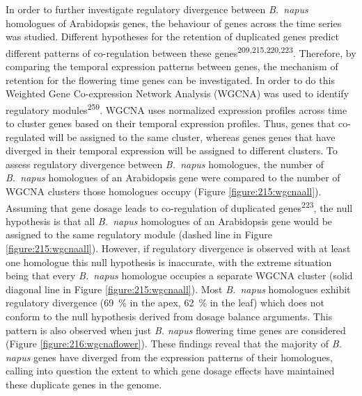 \documentclass[12pt,]{book}
\begin{document}
In order to further investigate regulatory divergence between
\emph{B.~napus} homologues of Arabidopsis genes, the behaviour of genes
across the time series was studied. Different hypotheses for the
retention of duplicated genes predict different patterns of
co-regulation between these genes\textsuperscript{209,215,220,223}.
Therefore, by comparing the temporal expression patterns between genes,
the mechanism of retention for the flowering time genes can be
investigated. In order to do this Weighted Gene Co-expression Network
Analysis (WGCNA) was used to identify regulatory
modules\textsuperscript{259}. WGCNA uses normalized expression profiles
across time to cluster genes based on their temporal expression
profiles. Thus, genes that co-regulated will be assigned to the same
cluster, whereas genes genes that have diverged in their temporal
expression will be assigned to different clusters. To assess regulatory
divergence between \emph{B.~napus} homologues, the number of
\emph{B.~napus} homologues of an Arabidopsis gene were compared to the
number of WGCNA clusters those homologues occupy (Figure
\ref{figure:215:wgcnaall}). Assuming that gene dosage leads to
co-regulation of duplicated genes\textsuperscript{223}, the null
hypothesis is that all \emph{B.~napus} homologues of an Arabidopsis gene
would be assigned to the same regulatory module (dashed line in Figure
\ref{figure:215:wgcnaall}). However, if regulatory divergence is
observed with at least one homologue this null hypothesis is inaccurate,
with the extreme situation being that every \emph{B.~napus} homologue
occupies a separate WGCNA cluster (solid diagonal line in Figure
\ref{figure:215:wgcnaall}). Most \emph{B.~napus} homologues exhibit
regulatory divergence (69~\% in the apex, 62~\% in the leaf) which does
not conform to the null hypothesis derived from dosage balance
arguments. This pattern is also observed when just \emph{B. napus}
flowering time genes are considered (Figure
\ref{figure:216:wgcnaflower}). These findings reveal that the majority
of \emph{B. napus} genes have diverged from the expression patterns of
their homologues, calling into question the extent to which gene dosage
effects have maintained these duplicate genes in the genome.
\end{document}
